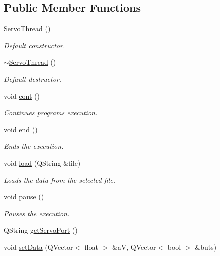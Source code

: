 \subsection*{Public Member Functions}
\begin{DoxyCompactItemize}
\item 
\hyperlink{class_servo_thread_af021de9817b11968dd627186e9e05a71}{Servo\+Thread} ()
\begin{DoxyCompactList}\small\item\em Default constructor. \end{DoxyCompactList}\item 
\hyperlink{class_servo_thread_a0c7ac1f603a247eac91d9780ad50f5fa}{$\sim$\+Servo\+Thread} ()
\begin{DoxyCompactList}\small\item\em Default destructor. \end{DoxyCompactList}\item 
void \hyperlink{class_servo_thread_a01c61d9505a2aeaa1a4fa4c05474738c}{cont} ()
\begin{DoxyCompactList}\small\item\em Continues program\textquotesingle{}s execution. \end{DoxyCompactList}\item 
void \hyperlink{class_servo_thread_aaa273318ffee5ba270cdaacba3f263f8}{end} ()
\begin{DoxyCompactList}\small\item\em Ends the execution. \end{DoxyCompactList}\item 
void \hyperlink{class_servo_thread_ae88d0a9c84099ca607c7cf929500fb26}{load} (Q\+String \&file)
\begin{DoxyCompactList}\small\item\em Loads the data from the selected file. \end{DoxyCompactList}\item 
void \hyperlink{class_servo_thread_ae0d4a59954aafbe8cd85f9326e4fcdd0}{pause} ()
\begin{DoxyCompactList}\small\item\em Pauses the execution. \end{DoxyCompactList}\item 
Q\+String \hyperlink{class_servo_thread_a3fae25aeac390640192ceb38e32dae40}{get\+Servo\+Port} ()
\item 
void \hyperlink{class_servo_thread_a8497ea56991b620981ce1fbf53d9ebdb}{set\+Data} (Q\+Vector$<$ float $>$ \&a\+V, Q\+Vector$<$ bool $>$ \&buts)

\end{DoxyCompactItemize}
